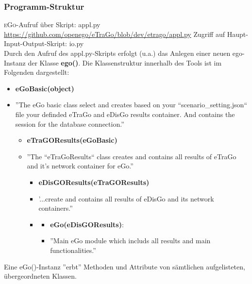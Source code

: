 \documentclass[
a4paper,     %
12pt         %
]{scrartcl}  %
\begin{document}
\subsubsection{Programm-Struktur}
\textsc{eGo}-Aufruf über Skript: appl.py\\
\url{https://github.com/openego/eTraGo/blob/dev/etrago/appl.py}
Zugriff auf Haupt-Input-Output-Skript: io.py\\

Durch den Aufruf des appl.py-Skripts erfolgt (u.a.) das Anlegen einer neuen ego-Instanz der Klasse \textbf{ego()}. Die Klassenstruktur innerhalb des Tools ist im Folgenden dargestellt:

\begin{itemize}
	\item[] \textbf{eGoBasic(object)}
	\item[] ''The eGo basic class select and creates based on your
	``scenario\_setting.json`` file  your definded eTraGo and
	eDisGo results container. And contains the session for the
	database connection.''
	
	\begin{itemize}
		\item[] \textbf{eTraGOResults(eGoBasic)}
		\item[] ''The ``eTraGoResults`` class creates and contains all results of eTraGo  and it's network container for eGo.''
		
		\begin{itemize}
			\item[] \textbf{eDisGOResults(eTraGOResults)}
			\item[] '...create and contains all results of eDisGo and its network containers.''
			\item[]
			\begin{itemize}
				\item[] \textbf{eGo(eDisGOResults)}:
				\item[] ''Main eGo module which includs all results and main functionalities.''
			\end{itemize}
		\end{itemize}
	\end{itemize}
\end{itemize}

Eine eGo()-Instanz ''erbt'' Methoden und Attribute von sämtlichen aufgelisteten, übergeordneten Klassen.
 
\end{document}
